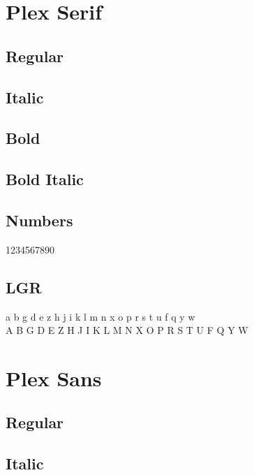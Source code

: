 \documentclass{article}
\begin{document}
\section*{Plex Serif}

\subsection*{Regular}
\lipsum[1]

\subsection*{Italic}
\textit{\lipsum[2]}

\subsection*{Bold}

\textbf{\lipsum[3]}



\subsection*{Bold Italic}

\textbf{\textit{\lipsum[4]}}

\subsection*{Numbers}

1234567890

\subsection*{LGR}

{\plexseriflgr\noindent
 a b g d e z h j i k l m n x o p r s t u f q y w\\
 A B G D E Z H J I K L M N X O P R S T U F Q Y W\\
}

\clearpage
\section*{Plex Sans}

\plexsans 

\subsection*{Regular}
\lipsum[1]

\subsection*{Italic}
\textit{\lipsum[2]}
\end{document}
